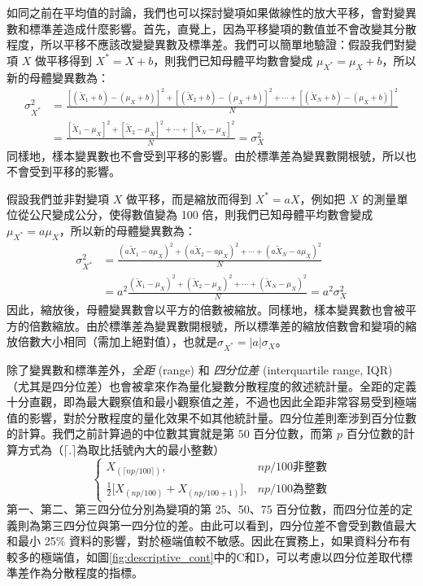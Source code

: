     如同之前在平均值的討論，我們也可以探討變項如果做線性的放大平移，會對變異數和標準差造成什麼影響。首先，直覺上，因為平移變項的數值並不會改變其分散程度，所以平移不應該改變變異數及標準差。我們可以簡單地驗證：假設我們對變項 $X$ 做平移得到 $X^* = X+b$，則我們已知母體平均數會變成 $\mu_{X^*} = \mu_X+b$，所以新的母體變異數為：
    \begin{align*}
        \sigma^2_{X^*} &= \frac{[(\tilde{X}_1+b)-(\mu_X+b)]^2+[(\tilde{X}_2+b)-(\mu_X+b)]^2+\cdots+[(\tilde{X}_N+b)-(\mu_X+b)]^2}{N} \\
        &= \frac{[\tilde{X}_1-\mu_X]^2+[\tilde{X}_2-\mu_X]^2+\cdots+[\tilde{X}_N-\mu_X]^2}{N} = \sigma_X^2
    \end{align*}
    同樣地，樣本變異數也不會受到平移的影響。由於標準差為變異數開根號，所以也不會受到平移的影響。

    假設我們並非對變項 $X$ 做平移，而是縮放而得到 $X^* = aX$，例如把 $X$ 的測量單位從公尺變成公分，使得數值變為 100 倍，則我們已知母體平均數會變成 $\mu_{X^*} = a\mu_X$，所以新的母體變異數為：
    \begin{align*}
        \sigma^2_{X^*} &= \frac{(a\tilde{X}_1-a\mu_X)^2+(a\tilde{X}_2-a\mu_X)^2+\cdots+(a\tilde{X}_N-a\mu_X)^2}{N} \\
        &= a^2\frac{(\tilde{X}_1-\mu_X)^2+(\tilde{X}_2-\mu_X)^2+\cdots+(\tilde{X}_N-\mu_X)^2}{N} = a^2\sigma_X^2
    \end{align*}
    因此，縮放後，母體變異數會以平方的倍數被縮放。同樣地，樣本變異數也會被平方的倍數縮放。由於標準差為變異數開根號，所以標準差的縮放倍數會和變項的縮放倍數大小相同（需加上絕對值），也就是$\sigma_{X^*} = |a|\sigma_X$。

    除了變異數和標準差外，\textit{全距} (range) 和 \textit{四分位差} (interquartile range, IQR) （尤其是四分位差）也會被拿來作為量化變數分散程度的敘述統計量。全距的定義十分直觀，即為最大觀察值和最小觀察值之差，不過也因此全距非常容易受到極端值的影響，對於分散程度的量化效果不如其他統計量。四分位差則牽涉到百分位數的計算。我們之前計算過的中位數其實就是第 $50$ 百分位數，而第 $p$ 百分位數的計算方式為（$\lceil.\rceil$為取比括號內大的最小整數）
    \[\left\{\begin{array}{lr}
        X_{(\lceil np/100 \rceil)}, & np/100 \text{非整數}\\
        \frac{1}{2}\Big[X_{(np/100)}+X_{(np/100+1)}\Big], & np/100 \text{為整數}
    \end{array}\right.\]
    第一、第二、第三四分位分別為變項的第 25、50、75 百分位數，而四分位差的定義則為第三四分位與第一四分位的差。由此可以看到，四分位差不會受到數值最大和最小 25$\%$ 資料的影響，對於極端值較不敏感。因此在實務上，如果資料分布有較多的極端值，如圖\ref{fig:descriptive_cont}中的C和D，可以考慮以四分位差取代標準差作為分散程度的指標。

